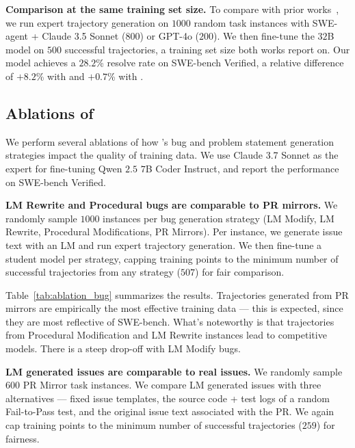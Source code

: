 \textbf{Comparison at the same training set size.}
To compare with prior works~\citep{jain2025r2e-gym,pan_training_2024}, we run expert trajectory generation on $1000$ random \bugs{} task instances with SWE-agent + Claude 3.5 Sonnet ($800$) or GPT-4o ($200$).
We then fine-tune the $32$B model on $500$ successful trajectories, a training set size both works report on.
Our model achieves a $28.2$\% resolve rate on SWE-bench Verified, a relative difference of $+8.2$\% with \citet{pan_training_2024} and $+0.7$\% with \citet{jain2025r2e-gym}.

\subsection{Ablations of \bugs{}}
\label{sec:results:ablations}
We perform several ablations of how \bugs{}'s bug and problem statement generation strategies impact the quality of training data.
We use Claude 3.7 Sonnet as the expert for fine-tuning Qwen $2.5$ $7$B Coder Instruct, and report the performance on SWE-bench Verified.

\textbf{LM Rewrite and Procedural bugs are comparable to PR mirrors.}
We randomly sample $1000$ instances per bug generation strategy (LM Modify, LM Rewrite, Procedural Modifications, PR Mirrors).
Per instance, we generate issue text with an LM and run expert trajectory generation.
We then fine-tune a student model per strategy, capping training points to the minimum number of successful trajectories from any strategy ($507$) for fair comparison.

Table~\ref{tab:ablation_bug} summarizes the results.
Trajectories generated from PR mirrors are empirically the most effective training data --- this is expected, since they are most reflective of SWE-bench.
What's noteworthy is that trajectories from Procedural Modification and LM Rewrite instances lead to competitive models.
There is a steep drop-off with LM Modify bugs.

\textbf{LM generated issues are comparable to real issues.}
We randomly sample $600$ PR Mirror task instances.
We compare LM generated issues with three alternatives --- fixed issue templates, the source code + test logs of a random Fail-to-Pass test, and the original issue text associated with the PR.
We again cap training points to the minimum number of successful trajectories ($259$) for fairness.

